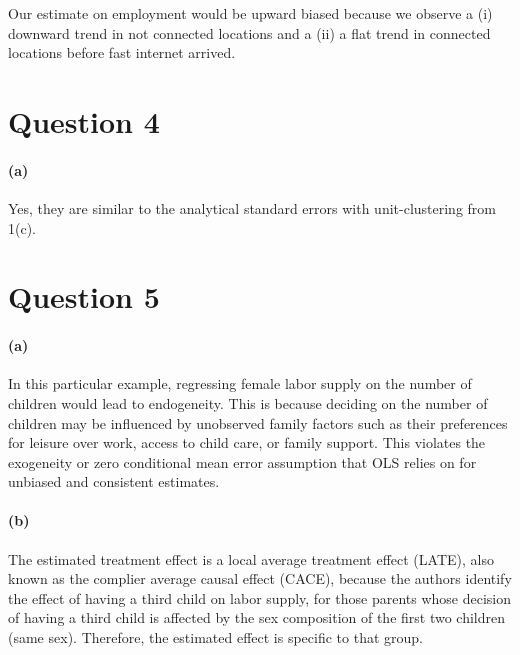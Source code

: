 \documentclass{scrartcl}
\begin{document}
Our estimate on employment would be upward biased because we observe a (i) downward trend in not connected locations and a (ii) a flat trend in connected locations before fast internet arrived.

\section*{Question 4}

\paragraph*{(a)} Yes, they are similar to the analytical standard errors with unit-clustering from 1(c).



\section*{Question 5}

\paragraph*{(a)}


In this particular example, regressing female labor supply on the number of children would lead to endogeneity. This is because deciding on the number of children may be influenced by unobserved family factors such as their preferences for leisure over work, access to child care, or family support. This violates the exogeneity or zero conditional mean error assumption that OLS relies on for unbiased and consistent estimates.

\paragraph*{(b)}


The estimated treatment effect is a local average treatment effect (LATE), also known as the complier average causal effect (CACE), because the authors identify the effect of having a third child on labor supply, for those parents whose decision of having a third child is affected by the sex composition of the first two children (same sex). Therefore, the estimated effect is specific to that group. 
\end{document}
